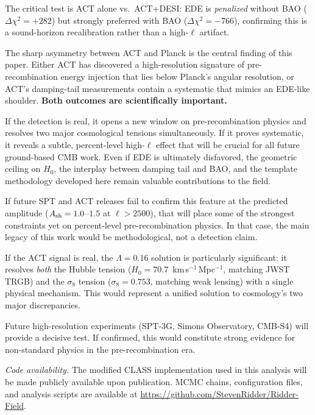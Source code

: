 \documentclass[twocolumn,showpacs,preprintnumbers,amsmath,amssymb,prd]{revtex4-2}
\newcommand{\kms}{km\,s$^{-1}$\,Mpc$^{-1}$}
\begin{document}
The critical test is ACT alone vs.\ ACT+DESI: EDE is \emph{penalized} without 
BAO ($\Delta\chi^2 = +282$) but strongly preferred with BAO ($\Delta\chi^2 = -766$), 
confirming this is a sound-horizon recalibration rather than a high-$\ell$ artifact.

The sharp asymmetry between ACT and Planck is the central finding of this 
paper. Either ACT has discovered a high-resolution signature of pre-recombination 
energy injection that lies below Planck's angular resolution, or ACT's 
damping-tail measurements contain a systematic that mimics an EDE-like shoulder.
\textbf{Both outcomes are scientifically important.}

If the detection is real, it opens a new window on pre-recombination physics 
and resolves two major cosmological tensions simultaneously. If it proves 
systematic, it reveals a subtle, percent-level high-$\ell$ effect that will 
be crucial for all future ground-based CMB work. Even if EDE is ultimately 
disfavored, the geometric ceiling on $H_0$, the interplay between damping 
tail and BAO, and the template methodology developed here remain valuable 
contributions to the field.

If future SPT and ACT releases fail to confirm this feature at the predicted 
amplitude ($A_{\rm sh} = 1.0$--$1.5$ at $\ell > 2500$), that will place some 
of the strongest constraints yet on percent-level pre-recombination physics. 
In that case, the main legacy of this work would be methodological, not a 
detection claim.

If the ACT signal is real, the $\Lambda = 0.16$ solution is particularly 
significant: it resolves \emph{both} the Hubble tension ($H_0 = 70.7$~\kms, 
matching JWST TRGB) and the $\sigma_8$ tension ($\sigma_8 = 0.753$, matching 
weak lensing) with a single physical mechanism. This would represent a 
unified solution to cosmology's two major discrepancies.

Future high-resolution experiments (SPT-3G, Simons Observatory, CMB-S4) will 
provide a decisive test. If confirmed, this would constitute strong evidence 
for non-standard physics in the pre-recombination era.

\emph{Code availability.} The modified \textsc{CLASS} implementation used in 
this analysis will be made publicly available upon publication. MCMC chains, 
configuration files, and analysis scripts are available at 
\url{https://github.com/StevenRidder/Ridder-Field}.

\begin{acknowledgments}
\end{acknowledgments}
\end{document}

